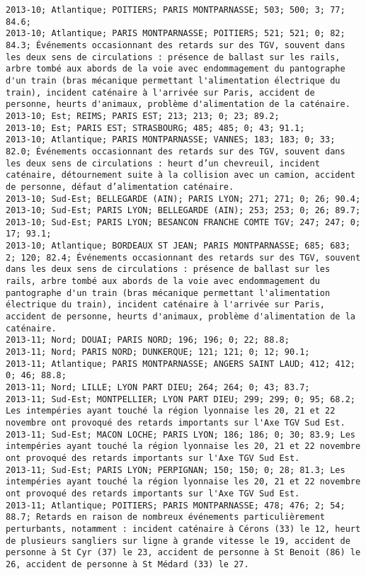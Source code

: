 \documentclass{article}
\begin{document}
\begin{Verbatim}[commandchars=\\\{\}]
2013-10; Atlantique; POITIERS; PARIS MONTPARNASSE; 503; 500; 3; 77; 84.6; 
2013-10; Atlantique; PARIS MONTPARNASSE; POITIERS; 521; 521; 0; 82; 84.3; Événements occasionnant des retards sur des TGV, souvent dans les deux sens de circulations : présence de ballast sur les rails, arbre tombé aux abords de la voie avec endommagement du pantographe d'un train (bras mécanique permettant l'alimentation électrique du train), incident caténaire à l'arrivée sur Paris, accident de personne, heurts d'animaux, problème d'alimentation de la caténaire.
2013-10; Est; REIMS; PARIS EST; 213; 213; 0; 23; 89.2; 
2013-10; Est; PARIS EST; STRASBOURG; 485; 485; 0; 43; 91.1; 
2013-10; Atlantique; PARIS MONTPARNASSE; VANNES; 183; 183; 0; 33; 82.0; Événements occasionnant des retards sur des TGV, souvent dans les deux sens de circulations : heurt d’un chevreuil, incident caténaire, détournement suite à la collision avec un camion, accident de personne, défaut d’alimentation caténaire.
2013-10; Sud-Est; BELLEGARDE (AIN); PARIS LYON; 271; 271; 0; 26; 90.4; 
2013-10; Sud-Est; PARIS LYON; BELLEGARDE (AIN); 253; 253; 0; 26; 89.7; 
2013-10; Sud-Est; PARIS LYON; BESANCON FRANCHE COMTE TGV; 247; 247; 0; 17; 93.1; 
2013-10; Atlantique; BORDEAUX ST JEAN; PARIS MONTPARNASSE; 685; 683; 2; 120; 82.4; Événements occasionnant des retards sur des TGV, souvent dans les deux sens de circulations : présence de ballast sur les rails, arbre tombé aux abords de la voie avec endommagement du pantographe d'un train (bras mécanique permettant l'alimentation électrique du train), incident caténaire à l'arrivée sur Paris, accident de personne, heurts d'animaux, problème d'alimentation de la caténaire.
2013-11; Nord; DOUAI; PARIS NORD; 196; 196; 0; 22; 88.8; 
2013-11; Nord; PARIS NORD; DUNKERQUE; 121; 121; 0; 12; 90.1; 
2013-11; Atlantique; PARIS MONTPARNASSE; ANGERS SAINT LAUD; 412; 412; 0; 46; 88.8; 
2013-11; Nord; LILLE; LYON PART DIEU; 264; 264; 0; 43; 83.7; 
2013-11; Sud-Est; MONTPELLIER; LYON PART DIEU; 299; 299; 0; 95; 68.2; Les intempéries ayant touché la région lyonnaise les 20, 21 et 22 novembre ont provoqué des retards importants sur l'Axe TGV Sud Est.
2013-11; Sud-Est; MACON LOCHE; PARIS LYON; 186; 186; 0; 30; 83.9; Les intempéries ayant touché la région lyonnaise les 20, 21 et 22 novembre ont provoqué des retards importants sur l'Axe TGV Sud Est.
2013-11; Sud-Est; PARIS LYON; PERPIGNAN; 150; 150; 0; 28; 81.3; Les intempéries ayant touché la région lyonnaise les 20, 21 et 22 novembre ont provoqué des retards importants sur l'Axe TGV Sud Est.
2013-11; Atlantique; POITIERS; PARIS MONTPARNASSE; 478; 476; 2; 54; 88.7; Retards en raison de nombreux événements particulièrement perturbants, notamment : incident caténaire à Cérons (33) le 12, heurt de plusieurs sangliers sur ligne à grande vitesse le 19, accident de personne à St Cyr (37) le 23, accident de personne à St Benoit (86) le 26, accident de personne à St Médard (33) le 27.

\end{Verbatim}
\end{document}
